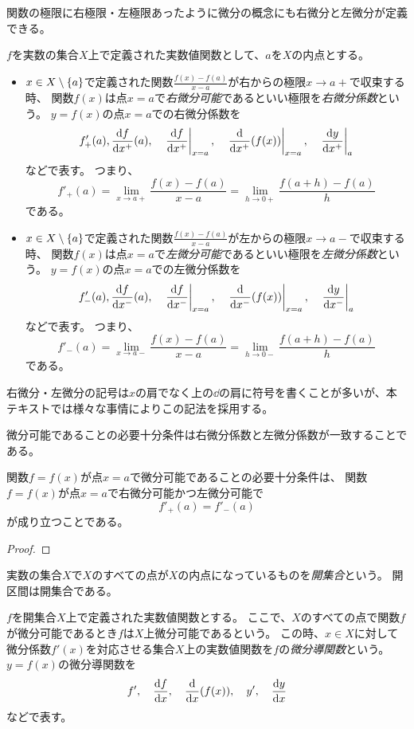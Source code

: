 関数の極限に右極限・左極限あったように微分の概念にも右微分と左微分が定義できる。

\begin{definition}[片側微分]
$f$を実数の集合$X$上で定義された実数値関数として、$a$を$X$の内点とする。
\begin{itemize}
\item
$x \in X\setminus\{a\}$で定義された関数$\frac{f(x)-f(a)}{x-a}$が右からの極限$x \to a+$で収束する時、
関数$f(x)$は点$x = a$で\emph{右微分可能}であるといい極限を\emph{右微分係数}という。
$y = f(x)$の点$x = a$での右微分係数を
$$
f'_+(a), \dv{f}{x^+}{(a)}, \quad \eval{\dv{f}{x^+}}_{x = a}, \quad \eval{\dv{x^+}(f(x))}_{x = a}, \quad \eval{\dv{y}{x^+}}_a
$$
などで表す。
つまり、
$$
f'_+(a) = \lim_{x \to a+}\frac{f(x)-f(a)}{x-a} = \lim_{h \to 0+}\frac{f(a+h)-f(a)}{h}
$$
である。
\item
$x \in X\setminus\{a\}$で定義された関数$\frac{f(x)-f(a)}{x-a}$が左からの極限$x \to a-$で収束する時、
関数$f(x)$は点$x = a$で\emph{左微分可能}であるといい極限を\emph{左微分係数}という。
$y = f(x)$の点$x = a$での左微分係数を
$$
f'_-(a), \dv{f}{x^-}{(a)}, \quad \eval{\dv{f}{x^-}}_{x = a}, \quad \eval{\dv{x^-}(f(x))}_{x = a}, \quad \eval{\dv{y}{x^-}}_a
$$
などで表す。
つまり、
$$
f'_-(a) = \lim_{x \to a-}\frac{f(x)-f(a)}{x-a} = \lim_{h \to 0-}\frac{f(a+h)-f(a)}{h}
$$
である。
\end{itemize}
\end{definition}

右微分・左微分の記号は$x$の肩でなく上の$\dd$の肩に符号を書くことが多いが、本テキストでは様々な事情によりこの記法を採用する。

微分可能であることの必要十分条件は右微分係数と左微分係数が一致することである。

\begin{proposition}
\label{t_semidiff}
関数$f = f(x)$が点$x = a$で微分可能であることの必要十分条件は、
関数$f = f(x)$が点$x = a$で右微分可能かつ左微分可能で
$$
f'_+(a) = f'_-(a)
$$
が成り立つことである。
\end{proposition}

\begin{proof}
\end{proof}

実数の集合$X$で$X$のすべての点が$X$の内点になっているものを\emph{開集合}という。
開区間は開集合である。

\begin{definition}[微分導関数]
$f$を開集合$X$上で定義された実数値関数とする。
ここで、$X$のすべての点で関数$f$が微分可能であるとき$f$は$X$上微分可能であるという。
この時、$x \in X$に対して微分係数$f'(x)$を対応させる集合$X$上の実数値関数を$f$の\emph{微分導関数}という。
$y = f(x)$の微分導関数を
$$
f', \quad \dv{f}{x}, \quad \dv{x}(f(x)), \quad y', \quad \dv{y}{x}
$$
などで表す。
\end{definition}

